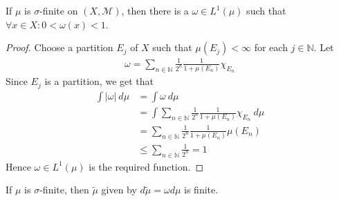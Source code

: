 \begin{lemma}
  If $\mu$ is $\sigma$-finite on $(X, \mathcal{M})$, then there is a
  $\omega \in L^{1}(\mu)$ such that $\forall x \in X : 0 <  \omega(x) < 1$.
\end{lemma}
\begin{proof}
  Choose a partition $E_j$ of $X$ such that $\mu(E_j) < \infty$ for
  each $j \in \mathbb{N}$. Let
  \begin{align*}
    \omega = \sum_{n \in \mathbb{N}} \frac{1}{2^n} \frac{1}{1 +
    \mu(E_n)} \chi_{E_n}
  \end{align*}
  Since $E_j$ is a partition, we get that
  \begin{align*}
    \int |\omega| \ d \mu &= \int \omega \ d \mu \\
    &= \int \sum_{n \in \mathbb{N}} \frac{1}{2^n} \frac{1}{1 +
    \mu(E_n)} \chi_{E_n} \ d \mu \\
    &= \sum_{n \in \mathbb{N}} \frac{1}{2^n} \frac{1}{1 +
    \mu(E_n)} \mu(E_n) \\
    &\le \sum_{n \in \mathbb{N}} \frac{1}{2^n}  = 1
  \end{align*}
  Hence $\omega \in L^{1}(\mu)$ is the required function.
\end{proof}

\begin{corollary}
  If $\mu$ is $\sigma$-finite, then $\tilde{ \mu}$ given by $d
  \tilde{\mu} = \omega d \mu$ is finite.
\end{corollary}

